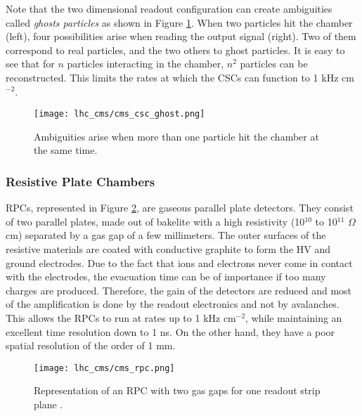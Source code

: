                 Note that the two dimensional readout configuration can create ambiguities called \emph{ghosts particles} as shown in Figure \ref{fig:muon_chambers__ghosts}. When two particles hit the chamber (left), four possibilities arise when reading the output signal (right). Two of them correspond to real particles, and the two others to ghost particles. It is easy to see that for $ n $ particles interacting in the chamber, $ n^2 $ particles can be reconstructed. This limits the rates at which the CSCs can function to 1 kHz cm$ ^{-2} $. 

                \begin{figure}[h!]
                    \centering
                    \texttt{[image: lhc\_cms/cms\_csc\_ghost.png]}
                    \caption{Ambiguities arise when more than one particle hit the chamber at the same time.}
                    \label{fig:muon_chambers__ghosts}
                \end{figure}
        
            \subsubsection{Resistive Plate Chambers}

                RPCs, represented in Figure \ref{fig:muon_chambers__rpc}, are gaseous parallel plate detectors. They consist of two parallel plates, made out of bakelite with a high resistivity (10$ ^{10} $ to 10$ ^{11} $ $ \Omega $ cm) separated by a gas gap of a few millimeters. The outer surfaces of the resistive materials are coated with conductive graphite to form the HV and ground electrodes. Due to the fact that ions and electrons never come in contact with the electrodes, the evacuation time can be of importance if too many charges are produced. Therefore, the gain of the detectors are reduced and most of the amplification is done by the readout electronics and not by avalanches. This allows the RPCs to run at rates up to 1 kHz cm$ ^{-2} $, while maintaining an excellent time resolution down to 1 ns. On the other hand, they have a poor spatial resolution of the order of 1 mm. \\

                \begin{figure}[h!]
                    \centering
                    \texttt{[image: lhc\_cms/cms\_rpc.png]}
                    \caption{Representation of an RPC with two gas gaps for one readout strip plane \Cite{These_Karol}.}
                    \label{fig:muon_chambers__rpc}
                \end{figure}

